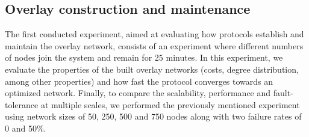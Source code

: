 \begin{table} \label{table:proto_test_params}
    \caption{Membership evaluation: protocol configuration parameters}
\end{table}

\subsection{Overlay construction and maintenance}

The first conducted experiment, aimed at evaluating how protocols establish and maintain the overlay network, consists of an experiment where different numbers of nodes join the system and remain for 25 minutes. In this experiment, we evaluate the properties of the built overlay networks (costs, degree distribution, among other properties) and how fast the protocol converges towards an optimized network. Finally, to compare the scalability, performance and fault-tolerance at multiple scales, we performed the previously mentioned experiment using network sizes of 50, 250, 500 and 750 nodes along with two failure rates of 0 and 50\%.

